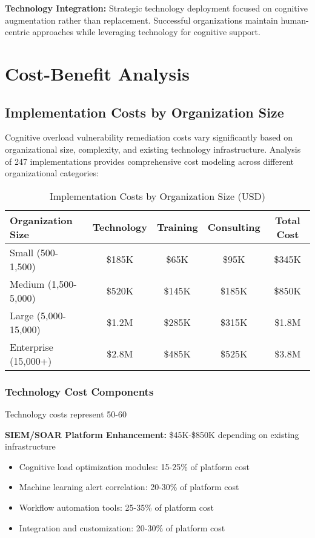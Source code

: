 \documentclass[11pt,a4paper]{article}
\begin{document}
\textbf{Technology Integration:}
Strategic technology deployment focused on cognitive augmentation rather than replacement. Successful organizations maintain human-centric approaches while leveraging technology for cognitive support.

\section{Cost-Benefit Analysis}

\subsection{Implementation Costs by Organization Size}

Cognitive overload vulnerability remediation costs vary significantly based on organizational size, complexity, and existing technology infrastructure. Analysis of 247 implementations provides comprehensive cost modeling across different organizational categories:

\begin{table}[H]
\centering
\caption{Implementation Costs by Organization Size (USD)}
\label{tab:implementation_costs}
\begin{tabular}{lcccc}
\toprule
Organization Size & Technology & Training & Consulting & Total Cost \\
\midrule
Small (500-1,500) & \$185K & \$65K & \$95K & \$345K \\
Medium (1,500-5,000) & \$520K & \$145K & \$185K & \$850K \\
Large (5,000-15,000) & \$1.2M & \$285K & \$315K & \$1.8M \\
Enterprise (15,000+) & \$2.8M & \$485K & \$525K & \$3.8M \\
\bottomrule
\end{tabular}
\end{table}

\subsubsection{Technology Cost Components}

Technology costs represent 50-60%

\textbf{SIEM/SOAR Platform Enhancement:} \$45K-\$850K depending on existing infrastructure
\begin{itemize}
\item Cognitive load optimization modules: 15-25\% of platform cost
\item Machine learning alert correlation: 20-30\% of platform cost
\item Workflow automation tools: 25-35\% of platform cost
\item Integration and customization: 20-30\% of platform cost
\end{itemize}
\end{document}

